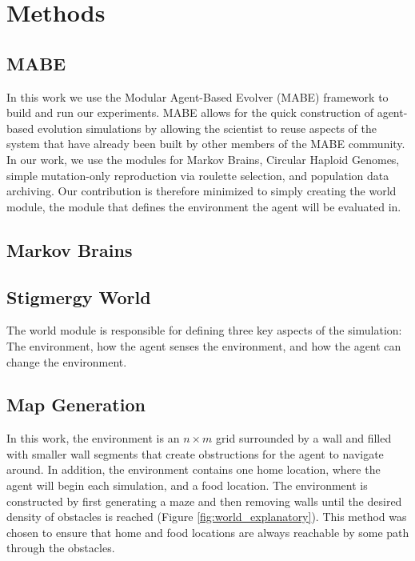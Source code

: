 \section{Methods}

\subsection{MABE}\label{mabe}

In this work we use the Modular Agent-Based Evolver\cite{bohm_mabe_2017} (MABE) framework to build and run our experiments. MABE allows for the quick construction of agent-based evolution simulations by allowing the scientist to reuse aspects of the system that have already been built by other members of the MABE community. In our work, we use the modules for Markov Brains, Circular Haploid Genomes, simple mutation-only reproduction via roulette selection, and population data archiving. Our contribution is therefore minimized to simply creating the world module, the module that defines the environment the agent will be evaluated in.

\subsection*{Markov Brains}


\subsection {Stigmergy World}\label{world}

The world module is responsible for defining three key aspects of the simulation: The environment, how the agent senses the environment, and how the agent can change the environment.

\subsection*{Map Generation}

In this work, the environment is an $n\times m$ grid surrounded by a wall and filled with smaller wall segments that create obstructions for the agent to navigate around. In addition, the environment contains one home location, where the agent will begin each simulation, and a food location. The environment is constructed by first generating a maze and then removing walls until the desired density of obstacles is reached (Figure \ref{fig:world_explanatory}). This method was chosen to ensure that home and food locations are always reachable by some path through the obstacles.

